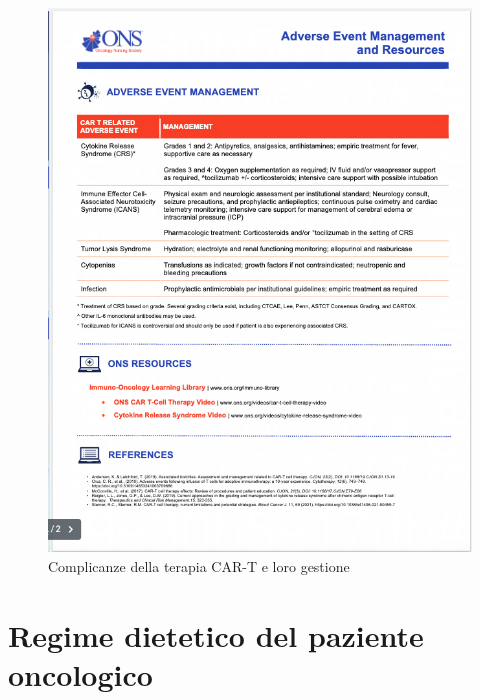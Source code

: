 \begin{figure}[H]
    \begin{center}
    \vspace{-3mm}
    \includegraphics[width=0.9\columnwidth]{img/CAR-T-SIDE-EFFECTS.png}
    \end{center}
    \caption{Complicanze della terapia CAR-T e loro gestione
    \cite{ONSCART}}

\end{figure}

\section{Regime dietetico del paziente oncologico}

